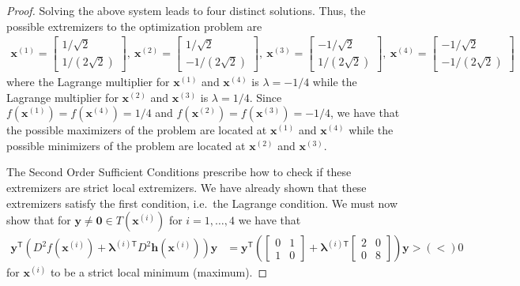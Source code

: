 \documentclass[12pt]{article}
\theoremstyle{definition}
\newcommand{\vc}[1]{\boldsymbol{#1}}
\newcommand{\tran}{\mathsf{T}}
\begin{document}
\begin{proof}
  Solving the above system leads to four distinct solutions.
  Thus, the possible extremizers to the optimization problem are
  \begin{align*}
    \vc{x}^{(1)} = \begin{bmatrix}1 / \sqrt{2} \\ 1 / (2\sqrt{2})\end{bmatrix},\
    \vc{x}^{(2)} = \begin{bmatrix}1 / \sqrt{2} \\ -1 / (2\sqrt{2})\end{bmatrix},\
    \vc{x}^{(3)} = \begin{bmatrix}-1 / \sqrt{2} \\ 1 / (2\sqrt{2})\end{bmatrix},\
    \vc{x}^{(4)} = \begin{bmatrix}-1 / \sqrt{2} \\ -1 / (2\sqrt{2})\end{bmatrix}
  \end{align*}
  where the Lagrange multiplier for $\vc{x}^{(1)}$ and $\vc{x}^{(4)}$ is $\lambda = -1/4$
  while the Lagrange multiplier for $\vc{x}^{(2)}$ and $\vc{x}^{(3)}$ is $\lambda = 1/4$.
  Since $f(\vc{x}^{(1)}) = f(\vc{x}^{(4)}) = 1/4$ and $f(\vc{x}^{(2)}) = f(\vc{x}^{(3)}) = -1/4$, we have that the possible
  maximizers of the problem are located at $\vc{x}^{(1)}$ and $\vc{x}^{(4)}$ while the
  possible minimizers of the problem are located at $\vc{x}^{(2)}$ and $\vc{x}^{(3)}$.

  The Second Order Sufficient Conditions prescribe how to check if these extremizers
  are strict local extremizers. We have already shown that these extremizers satisfy the first condition, i.e.\ the
  Lagrange condition. We must now show that for $\vc{y} \neq \vc{0} \in T(\vc{x}^{(i)})$ for $i=1,\dots,4$
  we have that
  \begin{align}\label{second}
    \vc{y}^\tran (D^2 f(\vc{x}^{(i)}) + \vc{\lambda}^{(i)\tran} D^2 \vc{h}(\vc{x}^{(i)}))\vc{y} &= \vc{y}^\tran\left(\begin{bmatrix}0 & 1 \\ 1 & 0\end{bmatrix} + \vc{\lambda}^{(i)\tran}\begin{bmatrix}2 & 0 \\ 0 &8\end{bmatrix}\right)\vc{y} > (<) 0
  \end{align}
  for $\vc{x}^{(i)}$ to be a strict local minimum (maximum).


\end{proof}
\end{document}
